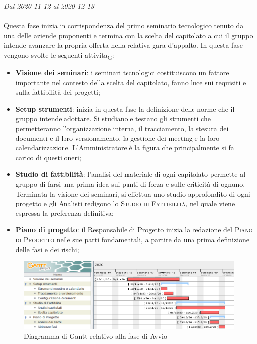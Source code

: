 \textit{Dal 2020-11-12 al 2020-12-13}
\\\\
Questa fase inizia in corrispondenza del primo seminario tecnologico tenuto da una delle aziende proponenti e termina con la scelta del capitolato a cui il gruppo intende avanzare la propria offerta nella relativa gara d'appalto.
In questa fase vengono svolte le seguenti \gls{attivita}\textsubscript{G}:
\begin{itemize}
	\item \textbf{Visione dei seminari}: i seminari tecnologici costituiscono un fattore importante nel contesto della scelta del capitolato, fanno luce sui requisiti e sulla fattibilità dei progetti;
	\item \textbf{Setup strumenti}: inizia in questa fase la definizione delle norme che il gruppo intende adottare. Si studiano e testano gli strumenti che permetteranno l'organizzazione interna, il tracciamento, la stesura dei documenti e il loro versionamento, la gestione dei meeting e la loro calendarizzazione. L'Amministratore è la figura che principalmente si fa carico di questi oneri;
	\item \textbf{Studio di fattibilità}: l'analisi del materiale di ogni capitolato permette al gruppo di farsi una prima idea sui punti di forza e sulle criticità di ognuno. Terminata la visione dei seminari, si effettua uno studio approfondito di ogni progetto e gli Analisti redigono lo \textsc{Studio di Fattibilità}, nel quale viene espressa la preferenza definitiva;
	\item \textbf{Piano di progetto}: il Responsabile di Progetto inizia la redazione del \textsc{Piano di Progetto} nelle sue parti fondamentali, a partire da una prima definizione delle fasi e dei rischi;
\end{itemize}  


\begin{figure}[H]
	\centering
	\includegraphics[scale=0.62]{res/images/01_gantt_avvio.png}
	\caption{Diagramma di Gantt relativo alla fase di Avvio}
\end{figure}




